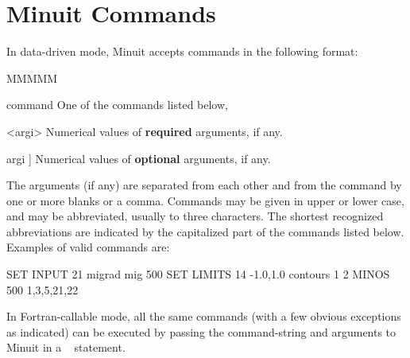  
\chapter{Minuit Commands}

In data-driven mode, Minuit accepts commands in the following
format:
 
 
\begin{DLtt}{MMMMM}
\item[command] One of the commands listed below,
\item[<argi>]           Numerical values of {\bf required} arguments, if any.
\item[\lsb{}argi\rsb]]  Numerical values of {\bf optional} arguments, if any.
\end{DLtt}

The arguments (if any) are separated from each other and from the
command by one or more blanks or a comma.
Commands may be given in upper or lower case, and may be abbreviated,
usually to three characters. The shortest recognized abbreviations
are indicated by the capitalized part of the commands listed below.
Examples of valid commands are:

\begin{XMP}
SET INPUT  21
migrad
mig  500
SET LIMITS  14  -1.0,1.0
contours  1  2
MINOS  500  1,3,5,21,22                            
\end{XMP}
 
In Fortran-callable mode, all the same commands (with a few
obvious exceptions as indicated) can be executed by passing the
command-string and arguments to Minuit in a ~ statement.
 
